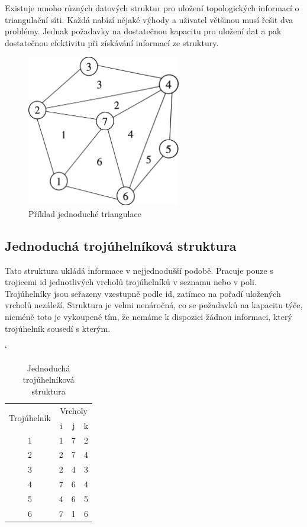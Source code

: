 \documentclass[12pt,a4paper]{article}
\begin{document}
Existuje mnoho různých datových struktur pro uložení topologických informací o triangulační síti. Každá nabízí nějaké výhody a uživatel většinou musí řešit dva problémy. Jednak požadavky na dostatečnou kapacitu pro uložení dat a pak dostatečnou efektivitu při získávání informací ze struktury.

\begin{figure}[h!]
\centering
\includegraphics[width=0.6\textwidth]{img/data_struct.png}
\caption{Příklad jednoduché triangulace}
\label{fig:struct_triangulace}
\end{figure}

\newpage
\subsection{Jednoduchá trojúhelníková struktura}
Tato struktura ukládá informace v nejjednodušší podobě. Pracuje pouze s trojicemi id jednotlivých vrcholů trojúhelníků v seznamu nebo v poli. Trojúhelníky jsou seřazeny vzestupně podle id, zatímco na pořadí uložených vrcholů nezáleží. Struktura je velmi nenáročná, co se požadavků na kapacitu týče, nicméně toto je vykoupené tím, že nemáme k dispozici žádnou informaci, který trojúhelník sousedí s kterým.

\begin{table}[h]
\catcode`
\begin{tabular}{|c||c|c|c|}
\hline
\multirow{2}{*}{Trojúhelník} & \multicolumn{3}{c|}{Vrcholy} \\ \cline{2-4} 
                             & i        & j       & k       \\ \hline \hline
1                            & 1        & 7       & 2       \\ \hline
2                            & 2        & 7       & 4       \\ \hline
3                            & 2        & 4       & 3       \\ \hline
4                            & 7        & 6       & 4       \\ \hline
5                            & 4        & 6       & 5       \\ \hline
6                            & 7        & 1       & 6       \\ \hline
\end{tabular}
\caption{Jednoduchá trojúhelníková struktura}
\label{tab:troj_struktura_simple}
\end{table}
\end{document}
